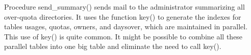 
Procedure \textsf{send\_summary()} sends mail to the administrator
summarizing all over-quota directories. It uses the function
\textsf{key()} to generate the indexes for tables
\textsf{usages}, \textsf{quotas}, \textsf{owners}, and
\textsf{daysover}, which are maintained in parallel. This use of
\textsf{key()} is quite common. It might be possible to combine all
these parallel tables into one big table and eliminate the need to call
\textsf{key()}.

